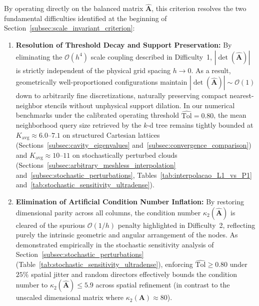 \documentclass[preprint,12pt]{elsarticle}
\begin{document}
By operating directly on the balanced matrix $\widehat{\mathbf{A}}$, this criterion resolves the two fundamental difficulties identified at the beginning of Section~\ref{subsec:scale_invariant_criterion}:
\begin{enumerate}
    \item \textbf{Resolution of Threshold Decay and Support Preservation:} By eliminating the $\mathcal{O}(h^4)$ scale coupling described in Difficulty~1, $|\det(\widehat{\mathbf{A}})|$ is strictly independent of the physical grid spacing $h \to 0$. As a result, geometrically well-proportioned configurations maintain $|\det(\widehat{\mathbf{A}})| \sim \mathcal{O}(1)$ down to arbitrarily fine discretizations, naturally preserving compact nearest-neighbor stencils without unphysical support dilation. In our numerical benchmarks under the calibrated operating threshold $\widehat{\mathrm{Tol}} = 0.80$, the mean neighborhood query size retrieved by the $k$-d tree remains tightly bounded at $K_{\mathrm{avg}} \approx 6.0\text{--}7.1$ on structured Cartesian lattices (Sections~\ref{subsec:cavity_eigenvalues} and~\ref{subsec:convergence_comparison}) and $K_{\mathrm{avg}} \approx 10\text{--}11$ on stochastically perturbed clouds (Sections~\ref{subsec:arbitrary_meshless_interpolation} and~\ref{subsec:stochastic_perturbations}, Tables~\ref{tab:interpolacao_L1_vs_P1} and~\ref{tab:stochastic_sensitivity_ultradense}).
    \item \textbf{Elimination of Artificial Condition Number Inflation:} By restoring dimensional parity across all columns, the condition number $\kappa_2(\widehat{\mathbf{A}})$ is cleared of the spurious $\mathcal{O}(1/h)$ penalty highlighted in Difficulty~2, reflecting purely the intrinsic geometric and angular arrangement of the nodes. As demonstrated empirically in the stochastic sensitivity analysis of Section~\ref{subsec:stochastic_perturbations} (Table~\ref{tab:stochastic_sensitivity_ultradense}), enforcing $\widehat{\mathrm{Tol}} \ge 0.80$ under $25\%$ spatial jitter and random directors effectively bounds the condition number to $\kappa_2(\widehat{\mathbf{A}}) \le 5.9$ across spatial refinement (in contrast to the unscaled dimensional matrix where $\kappa_2(\mathbf{A}) \approx 80$).
\end{enumerate}
\end{document}
